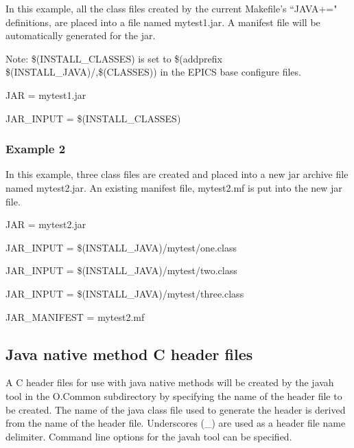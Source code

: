 In this example, all the class files created by the current Makefile's ``JAVA+=" definitions, are placed into a file named 
mytest1.jar. A manifest file will be automatically generated for the jar. 

Note: \$(INSTALL\_CLASSES) is set to \$(addprefix \$(INSTALL\_JAVA)/,\$(CLASSES)) in the EPICS base configure 
files.

\begin{description}

\item {}JAR = mytest1.jar

\item {}JAR\_INPUT = \$(INSTALL\_CLASSES)

\end{description}

\subsubsection{Example 2}

In this example, three class files are created and placed into a new jar archive file named mytest2.jar. An existing manifest 
file, mytest2.mf is put into the new jar file.

\begin{description}

\item JAR = mytest2.jar

\item JAR\_INPUT = \$(INSTALL\_JAVA)/mytest/one.class

\item JAR\_INPUT = \$(INSTALL\_JAVA)/mytest/two.class

\item JAR\_INPUT = \$(INSTALL\_JAVA)/mytest/three.class

\item JAR\_MANIFEST = mytest2.mf

\end{description}\subsection{Java native method C header files}

A C header files for use with java native methods will be created by the javah tool in the O.Common subdirectory by 
specifying the name of the header file to be created. The name of the java class file used to generate the header is derived 
from the name of the header file. Underscores (\_) are used as a header file name delimiter. Command line options for the 
javah tool can be specified.

